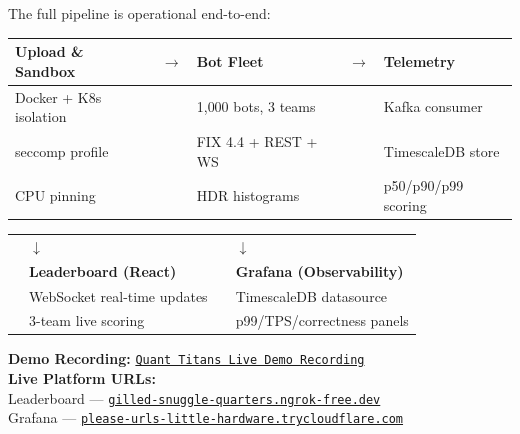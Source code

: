 \documentclass[12pt,a4paper]{article}
\begin{document}
The full pipeline is operational end-to-end:

\begin{center}
\begin{tabular}{C{3.2cm} C{0.6cm} C{3.2cm} C{0.6cm} C{3.2cm}}
  \toprule
  \textbf{Upload \& Sandbox} & $\rightarrow$ & \textbf{Bot Fleet} & $\rightarrow$ & \textbf{Telemetry} \\
  \midrule
  Docker + K8s isolation & & 1{,}000 bots, 3 teams & & Kafka consumer \\
  seccomp profile & & FIX 4.4 + REST + WS & & TimescaleDB store \\
  CPU pinning & & HDR histograms & & p50/p90/p99 scoring \\
  \bottomrule
\end{tabular}
\end{center}

\vspace{0.5em}

\begin{center}
\begin{tabular}{C{0.6cm} C{5cm} C{0.6cm} C{5cm}}
  & $\downarrow$ & & $\downarrow$ \\
  & \textbf{Leaderboard (React)} & & \textbf{Grafana (Observability)} \\
  & WebSocket real-time updates & & TimescaleDB datasource \\
  & 3-team live scoring & & p99/TPS/correctness panels \\
\end{tabular}
\end{center}

\vspace{1em}

\begin{infobox}
  \textbf{Demo Recording:} \href{https://drive.google.com/file/d/1E9xaJxHHFGDKy_20ZCiWIMj6p_5RHUQ6/view?usp=sharing}{%
  \texttt{Quant Titans Live Demo Recording}} \\[4pt]
  \textbf{Live Platform URLs:}\\
  \hspace{1em}Leaderboard — \href{https://gilled-snuggle-quarters.ngrok-free.dev}{\texttt{gilled-snuggle-quarters.ngrok-free.dev}}\\
  \hspace{1em}Grafana — \href{https://please-urls-little-hardware.trycloudflare.com}{\texttt{please-urls-little-hardware.trycloudflare.com}}
\end{infobox}
\end{document}
